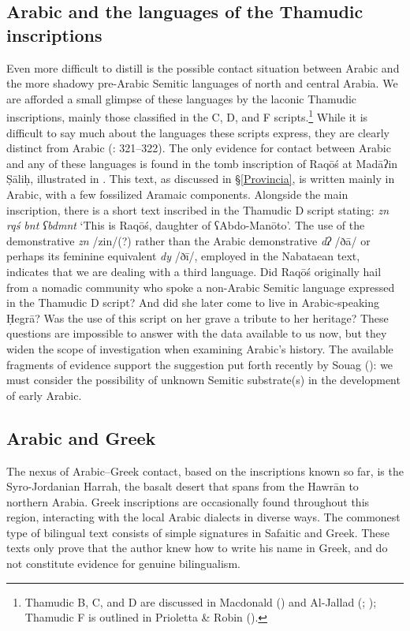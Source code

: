 \documentclass[output=paper]{langsci/langscibook}
\begin{document}
\subsection{Arabic and the languages of the Thamudic inscriptions}
Even more difficult to distill is the possible contact situation between Arabic and the more shadowy pre-Arabic Semitic languages of north and central Arabia. We are afforded a small glimpse of these languages by the laconic Thamudic inscriptions, mainly those classified in the C, D, and F scripts.\footnote{Thamudic B, C, and D are discussed in Macdonald (\citeyear{Macdonald2000}) and Al-Jallad (\citeyear{Al-Jallad2017early}; \citeyear{Al-Jallad2018ANA}); Thamudic F is outlined in Prioletta \& Robin (\citeyear{PriolettaRobin2018}).}  While it is difficult to say much about the languages these scripts express, they are clearly distinct from Arabic (\citealt{Al-Jallad2017early}: 321--322). The only evidence for contact between Arabic and any of these languages is found in the tomb inscription of Raqōś at Madāʔin Ṣāliḥ, illustrated in . This text, as discussed in §\ref{Provincia}, is written mainly in Arabic, with a few fossilized Aramaic components. Alongside the main inscription, there is a short text inscribed in the Thamudic D script stating: \textit{zn rqś bnt ʕbdmnt} ‘This is Raqōś, daughter of ʕAbdo-Manōto’. The use of the demonstrative \textit{zn} /zin/(?) rather than the Arabic demonstrative \textit{dʔ} /ðā/ or perhaps its feminine equivalent \textit{dy} /ðī/, employed in the Nabataean text, indicates that we are dealing with a third language. Did Raqōś originally hail from a nomadic community who spoke a non-Arabic Semitic language expressed in the Thamudic D script? And did she later come to live in Arabic-speaking Ḥegrā? Was the use of this script on her grave a tribute to her heritage? These questions are impossible to answer with the data available to us now, but they widen the scope of investigation when examining Arabic’s history. The available fragments of evidence support the suggestion put forth recently by Souag (\citeyear{Souag2018blog}): we must consider the possibility of unknown Semitic substrate(s) in the development of early Arabic.

\subsection{Arabic and Greek}
The nexus of Arabic--Greek contact, based on the inscriptions known so far, is the Syro-Jordanian Harrah, the basalt desert that spans from the Hawrān to northern Arabia. Greek inscriptions are occasionally found throughout this region, interacting with the local Arabic dialects in diverse ways. The commonest type of bilingual text consists of simple signatures in Safaitic and Greek. These texts only prove that the author knew how to write his name in Greek, and do not constitute evidence for genuine bilingualism. 
\end{document}
